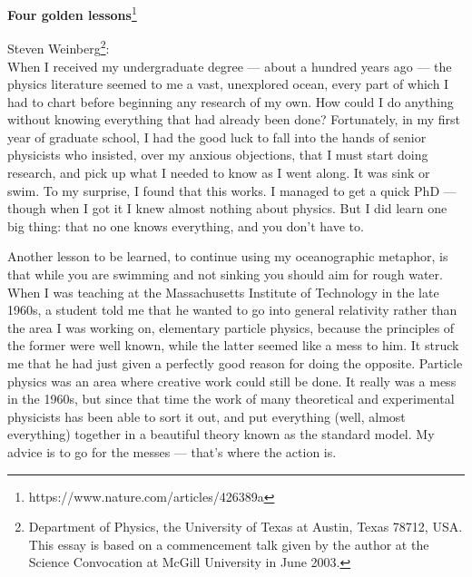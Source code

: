 \newpage
\begin{center}
    {\textbf{Four golden lessons}\footnote{https://www.nature.com/articles/426389a}}
\end{center}
Steven Weinberg\footnote{Department of Physics, the University of Texas at Austin, Texas 78712, USA. This essay is based on a commencement talk given by the author at the Science Convocation at McGill University in June 2003.}:\\

When I received my undergraduate degree — about a hundred years ago — the physics literature seemed to me a vast, unexplored ocean, every part of which I had to chart before beginning any research of my own. How could I do anything without knowing everything that had already been done? Fortunately, in my first year of graduate school, I had the good luck to fall into the hands of senior physicists who insisted, over my anxious objections, that I must start doing research, and pick up what I needed to know as I went along. It was sink or swim. To my surprise, I found that this works. I managed to get a quick PhD — though when I got it I knew almost nothing about physics. But I did learn one big thing: that no one knows everything, and you don't have to.

Another lesson to be learned, to continue using my oceanographic metaphor, is that while you are swimming and not sinking you should aim for rough water. When I was teaching at the Massachusetts Institute of Technology in the late 1960s, a student told me that he wanted to go into general relativity rather than the area I was working on, elementary particle physics, because the principles of the former were well known, while the latter seemed like a mess to him. It struck me that he had just given a perfectly good reason for doing the opposite. Particle physics was an area where creative work could still be done. It really was a mess in the 1960s, but since that time the work of many theoretical and experimental physicists has been able to sort it out, and put everything (well, almost everything) together in a beautiful theory known as the standard model. My advice is to go for the messes — that's where the action is.

